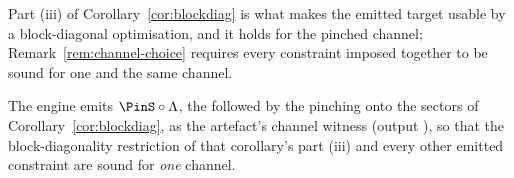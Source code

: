
Part (iii) of Corollary~\ref{cor:blockdiag} is what makes the emitted target
usable by a block-diagonal optimisation, and it holds for the pinched
channel; Remark~\ref{rem:channel-choice} requires every constraint imposed
together to be sound for one and the same channel.

\begin{requirement}\label{req:pinched-channel-witness}
The engine emits $\PinS\circ\Lambda$, the  followed by the
pinching onto the sectors of Corollary~\ref{cor:blockdiag}, as the
artefact's channel witness (output ), so that the
block-diagonality restriction of that corollary's part (iii) and every other
emitted constraint are sound for \emph{one} channel.
\end{requirement}
